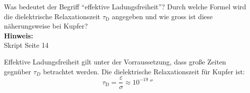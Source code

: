 \begin{question}[section=2,name={Ladungsfreiheit und Relaxationszeit},difficulty=,quantity=5,type=thr,tags={20131210}]
	Was bedeutet der Begriff "`effektive Ladungsfreiheit"'? Durch welche Formel wird die dielektrische Relaxationszeit $\tau_\mathrm{D}$ angegeben und wie gross ist diese näherungsweise bei Kupfer?
	\\ \textbf{Hinweis:}\\
	Skript Seite 14
\end{question}
\begin{solution}
	Effektive Ladungsfreiheit gilt unter der Vorraussetzung, dass große Zeiten gegnüber $\tau_D$ betrachtet werden. Die dielektrische Relaxationszeit für Kupfer ist:
	\begin{equation}
		\tau_\mathrm{D} = \frac{\varepsilon}{\sigma} \approx  10^{-19}\,\second
	\end{equation}
\end{solution}